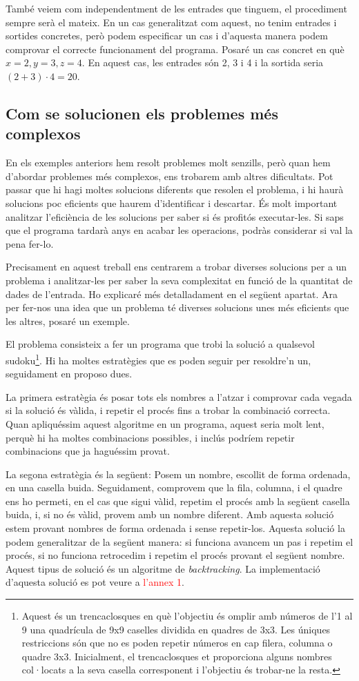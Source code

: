 També veiem com independentment de les entrades que tinguem, el procediment sempre serà el mateix. En un cas generalitzat com aquest, no tenim entrades i sortides concretes, però podem especificar un cas i d'aquesta manera podem comprovar el correcte funcionament del programa. Posaré un cas concret en què $x = 2, y = 3, z = 4$. En aquest cas, les entrades són 2, 3 i 4 i la sortida seria $(2+3)\cdot4 = 20$.


\subsection{Com se solucionen els problemes més complexos}
En els exemples anteriors hem resolt problemes molt senzills, però quan hem d'abordar problemes més complexos, ens trobarem amb altres dificultats. Pot passar que hi hagi moltes solucions diferents que resolen el problema, i hi haurà solucions poc eficients que haurem d'identificar i descartar. És molt important analitzar l'eficiència de les solucions per saber si és profitós executar-les. Si saps que el programa tardarà anys en acabar les operacions, podràs considerar si val la pena fer-lo.

Precisament en aquest treball ens centrarem a trobar diverses solucions per a un problema i analitzar-les per saber la seva complexitat en funció de la quantitat de dades de l'entrada. Ho explicaré més detalladament en el següent apartat. Ara per fer-nos una idea que un problema té diverses solucions unes més eficients que les altres, posaré un exemple.

El problema consisteix a fer un programa que trobi la solució a qualsevol sudoku\footnote{Aquest és un trencaclosques en què l'objectiu és omplir amb números de l'1 al 9 una quadrícula de 9x9 caselles dividida en quadres de 3x3. Les úniques restriccions són que no es poden repetir números en cap filera, columna o quadre 3x3. Inicialment, el trencaclosques et proporciona alguns nombres col·locats a la seva casella corresponent i l'objectiu és trobar-ne la resta.}. Hi ha moltes estratègies que es poden seguir per resoldre'n un, seguidament en proposo dues. 

La primera estratègia és posar tots els nombres a l'atzar i comprovar cada vegada si la solució és vàlida, i repetir el procés fins a trobar la combinació correcta. Quan apliquéssim aquest algoritme en un programa, aquest seria molt lent, perquè hi ha moltes combinacions possibles, i inclús podríem repetir combinacions que ja haguéssim provat.

La segona estratègia és la següent: Posem un nombre, escollit de forma ordenada, en una casella buida. Seguidament, comprovem que la fila, columna, i el quadre ens ho permeti, en el cas que sigui vàlid, repetim el procés amb la següent casella buida, i, si no és vàlid, provem amb un nombre diferent. Amb aquesta solució estem provant nombres de forma ordenada i sense repetir-los. Aquesta solució la podem generalitzar de la següent manera: si funciona avancem un pas i repetim el procés, si no funciona retrocedim i repetim el procés provant el següent nombre. Aquest tipus de solució és un algoritme de \textit{backtracking}. La implementació d'aquesta solució es pot veure a \textcolor{red}{l'annex 1}.

